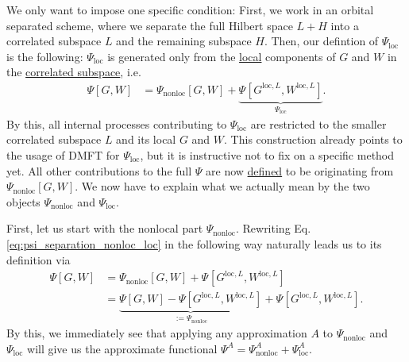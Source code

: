 \documentclass[12pt,a4paper]{scrartcl}
\numberwithin{equation}{section}
\begin{document}
We only want to impose one specific condition: First, we work in an orbital separated scheme,
where we separate the full Hilbert space $L+H$ into a correlated subspace $L$ and the remaining subspace $H$.
Then, our defintion of $\Psi_{\mathrm{loc}}$ is the following: $\Psi_{\mathrm{loc}}$ is generated only from the \underline{local}
components of $G$ and $W$ in the \underline{correlated subspace}, i.e.
\begin{align}
\Psi[G,W] &= \Psi_{\mathrm{nonloc}}[G,W] + \underbrace{\Psi_{}[G^{\mathrm{loc},L},W^{\mathrm{loc},L}]}_{\Psi_{\mathrm{loc}}}.
\label{eq:psi_separation_nonloc_loc}
\end{align}
By this, all internal processes contributing to $\Psi_{\mathrm{loc}}$ 
are restricted to the smaller correlated subspace $L$ and its local $G$ and $W$.
This construction already points to the usage of DMFT for $\Psi_{\mathrm{loc}}$, but it is instructive
not to fix on a specific method yet.
% 
% 
% 
% 
% 
% 
All other contributions to the full $\Psi$ are now \underline{defined} to be originating from $\Psi_{\mathrm{nonloc}}[G,W]$.
We now have to explain what we actually mean by the two objects 
$\Psi_{\mathrm{nonloc}}$ and $\Psi_{\mathrm{loc}}$.

% 

\bigskip

First, let us start with the nonlocal part $\Psi_{\mathrm{nonloc}}$.
Rewriting Eq. \eqref{eq:psi_separation_nonloc_loc} in the following way naturally
leads us to its definition via
\begin{align}
 \Psi[G,W] &= \Psi_{\mathrm{nonloc}}[G,W] + \Psi_{}[G^{\mathrm{loc},L},W^{\mathrm{loc},L}] \\
 &= \underbrace{\Psi[G,W]- \Psi[G^{\mathrm{loc},L},W^{\mathrm{loc},L}]}_{:=\Psi_{\mathrm{nonloc}}}
    + \Psi_{}[G^{\mathrm{loc},L},W^{\mathrm{loc},L}].
\end{align}
By this, we immediately see that applying any approximation $A$ to $\Psi_{\mathrm{nonloc}}$ and $\Psi_{\mathrm{loc}}$
will give us the approximate functional $\Psi^A = \Psi^A_{\mathrm{nonloc}}+\Psi^A_{\mathrm{loc}}$.
\end{document}
